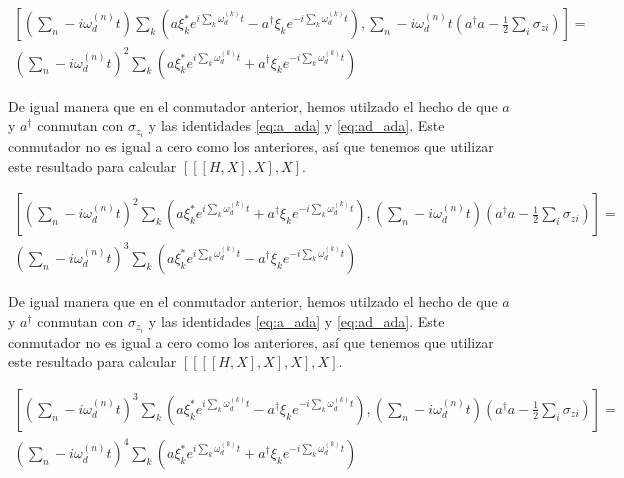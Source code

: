 \begin{multline}
    \left[\left(\sum\limits_n-i \omega_d^{(n)} t\right) \sum\limits_k \left(a\xi_k^*e^{i\sum\limits_k \omega_d^{(k)}t} - a^\dagger\xi_ke^{-i\sum\limits_k \omega_d^{(k)}t}\right), \sum\limits_n-i \omega_d^{(n)} t\left(a^\dagger a - \frac{1}{2} \sum\limits_i \sigma_{z i}\right)\right] = \\
    \left(\sum\limits_n-i \omega_d^{(n)} t\right)^2 \sum\limits_k \left(a\xi_k^*e^{i\sum\limits_k \omega_d^{(k)}t} + a^\dagger\xi_ke^{-i\sum\limits_k \omega_d^{(k)}t}\right)
\end{multline}
 
De igual manera que en el conmutador anterior, hemos utilzado el hecho de que $a$ y $a^\dagger$ conmutan con $\sigma_{z_i}$ y las identidades \ref{eq:a_ada} y \ref{eq:ad_ada}. Este conmutador no es igual a cero como los anteriores, así que tenemos que utilizar este resultado para calcular $[[[H,X],X],X]$.

\begin{multline}
    \left[\left(\sum\limits_n-i \omega_d^{(n)} t\right)^2 \sum\limits_k \left(a\xi_k^*e^{i\sum\limits_k \omega_d^{(k)}t}+ a^\dagger\xi_ke^{-i\sum\limits_k \omega_d^{(k)}t}\right), \left(\sum\limits_n-i \omega_d^{(n)} t\right)\left(a^\dagger a - \frac{1}{2} \sum\limits_i \sigma_{z i}\right)\right] = \\
    \left(\sum\limits_n-i \omega_d^{(n)} t\right)^3 \sum\limits_k \left(a\xi_k^*e^{i\sum\limits_k \omega_d^{(k)}t} - a^\dagger\xi_ke^{-i\sum\limits_k \omega_d^{(k)}t}\right)
\end{multline}

De igual manera que en el conmutador anterior, hemos utilzado el hecho de que $a$ y $a^\dagger$ conmutan con $\sigma_{z_i}$ y las identidades \ref{eq:a_ada} y \ref{eq:ad_ada}. Este conmutador no es igual a cero como los anteriores, así que tenemos que utilizar este resultado para calcular $[[[[H,X],X],X],X]$.

\begin{multline}
    \left[\left(\sum\limits_n-i \omega_d^{(n)} t\right)^3 \sum\limits_k \left(a\xi_k^*e^{i\sum\limits_k \omega_d^{(k)}t} - a^\dagger\xi_ke^{-i\sum\limits_k \omega_d^{(k)}t}\right), \left(\sum\limits_n-i \omega_d^{(n)} t\right)\left(a^\dagger a - \frac{1}{2} \sum\limits_i \sigma_{z i}\right)\right] = \\
    \left(\sum\limits_n-i \omega_d^{(n)} t\right)^4 \sum\limits_k \left(a\xi_k^*e^{i\sum\limits_k \omega_d^{(k)}t} + a^\dagger\xi_ke^{-i\sum\limits_k \omega_d^{(k)}t}\right)
\end{multline}

